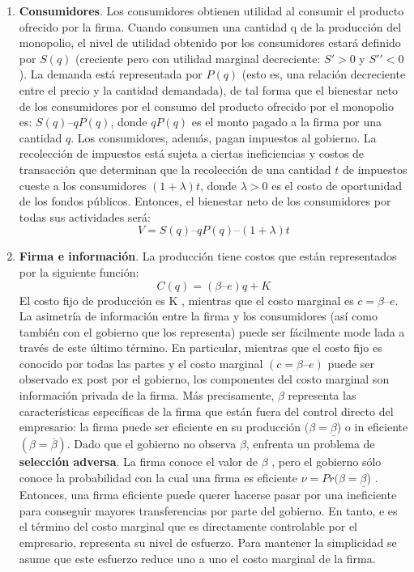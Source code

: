 \documentclass[
  12pt,
  spanish,
]{book}
\begin{document}
\begin{enumerate}
\def\labelenumi{\arabic{enumi}.}
\item
  \textbf{Consumidores}. Los consumidores obtienen utilidad al consumir el producto ofrecido por la firma. Cuando consumen una cantidad q de la producción del monopolio, el nivel de utilidad obtenido por los consumidores estará definido por \(S(q)\) (creciente pero con utilidad marginal decreciente: \(S′ > 0\) y \(S′′ < 0\)). La demanda está representada por \(P(q)\) (esto es, una relación decreciente entre el precio y la cantidad demandada), de tal forma que el bienestar neto de los consumidores por el consumo del producto ofrecido por el monopolio es: \(S(q) – qP(q)\), donde \(qP(q)\) es el monto pagado a la firma por una cantidad \(q\).
  Los consumidores, además, pagan impuestos al gobierno. La recolección de impuestos está sujeta a ciertas ineficiencias y costos de transacción que determinan que la recolección de una cantidad \(t\) de impuestos cueste a los consumidores \((1 + λ)t\), donde \(λ > 0\) es el costo de oportunidad de los fondos públicos. Entonces, el bienestar neto de los consumidores por todas sus actividades será:
  \[V = S(q) – qP(q) – (1 + λ)t\]
\item
  \textbf{Firma e información}. La producción tiene costos que están representados por la siguiente función: \[C(q) = (β – e)q + K\]
  El costo fijo de producción es K , mientras que el costo marginal es \(c = β – e\). La asimetría de información entre la firma y los consumidores (así como también con el gobierno que los representa) puede ser fácilmente mode lada a través de este último término. En particular, mientras que el costo fijo es conocido por todas las partes y el costo marginal \((c = β – e)\) puede ser observado ex post por el gobierno, los componentes del costo marginal son información privada de la firma.
  Más precisamente, \(β\) representa las características específicas de la firma que están fuera del control directo del empresario: la firma puede ser eficiente en su producción \((β = \underline β\)) o in eficiente \((β = \overline{β})\). Dado que el gobierno no observa \(β\), enfrenta un problema de \textbf{selección adversa}. La firma conoce el valor de \(β\) , pero el gobierno sólo conoce la probabilidad con la cual una firma es eficiente \(ν = Pr (β = \underline β\)) .
  Entonces, una firma eficiente puede querer hacerse pasar por una ineficiente para conseguir mayores transferencias por parte del gobierno. En tanto, e es el término del costo marginal que es directamente controlable por el empresario, representa su nivel de esfuerzo. Para mantener la simplicidad se asume que este esfuerzo reduce uno a uno el costo marginal de la firma.

\end{enumerate}
\end{document}
